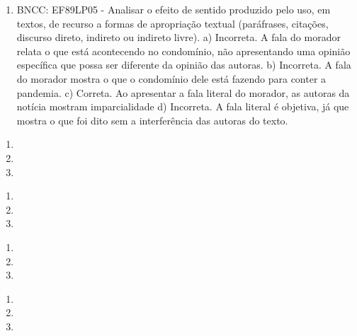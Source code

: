 \begin{enumerate}
\item
BNCC: EF89LP05 - Analisar o efeito de sentido produzido pelo uso, em
textos, de recurso a formas de apropriação textual (paráfrases,
citações, discurso direto, indireto ou indireto livre). a) Incorreta. A fala do morador relata o que está acontecendo no condomínio, não apresentando uma opinião específica que possa ser diferente da opinião das autoras. b) Incorreta. A fala do morador mostra o que o condomínio dele está fazendo para conter a pandemia. c) Correta. Ao apresentar a fala literal do morador, as autoras da notícia mostram imparcialidade d) Incorreta. A fala literal é objetiva, já que mostra o que foi dito sem a interferência das autoras do texto. 
\end{enumerate}


\begin{enumerate}
\item

\item

\item
\end{enumerate}


\begin{enumerate}
\item

\item

\item
\end{enumerate}


\begin{enumerate}
\item

\item

\item
\end{enumerate}


\begin{enumerate}
\item

\item

\item
\end{enumerate}

